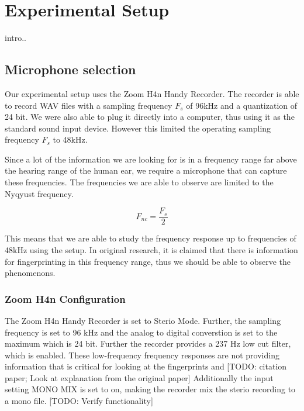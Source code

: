 \chapter{Experimental Setup}
\label{chp:experimental_setup} 

intro..

\section{Microphone selection}\label{sec:microphone_selection}

Our experimental setup uses the Zoom H4n Handy Recorder. 
The recorder is able to record WAV files with a sampling frequency \( {F_{s}} \) of 96kHz and a quantization of 24 bit. We were also able to plug it directly into a computer, thus using it as the standard sound input device. 
However this limited the operating sampling frequency \( {F_{s}} \) to 48kHz.

Since a lot of the information we are looking for is in a frequency range far above the hearing range of the human ear, we require a microphone that can capture these frequencies. 
The frequencies we are able to observe are limited to the Nyqyust frequency.

\begin{equation}\label{eq:nyquist_frequency}
F_{nc} = \frac{F_{s}}{2}
\end{equation}

This means that we are able to study the frequency response up to frequencies of 48kHz using the setup.
In original research, it is claimed that there is information for fingerprinting in this frequency range, thus we should be able to observe the phenomenons.

\subsection{Zoom H4n Configuration}\label{sec:zoom_H4n_configuration}

The Zoom H4n Handy Recorder is set to Sterio Mode.
Further, the sampling frequency is set to 96 kHz and the analog to digital converstion is set to the maximum which is 24 bit.
Further the recorder provides a 237 Hz low cut filter, which is enabled.
These low-frequency frequency responses are not providing information that is critical for looking at the fingerprints and [TODO: citation paper; Look at explanation from the original paper] 
Additionally the input setting MONO MIX is set to on, making the recorder mix the sterio recording to a mono file. [TODO: Verify functionality]



